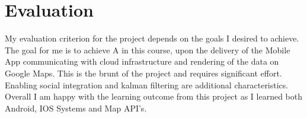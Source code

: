 \documentclass[10pt]{sigplan-proc-varsize}
\begin{document}
\section{Evaluation}
My evaluation criterion for the project depends on the goals I desired to achieve. The goal for me is to achieve A in this course, upon the delivery of the Mobile App communicating with cloud infrastructure and rendering of the data on Google Maps. This is the brunt of the project and requires significant effort. Enabling social integration and kalman filtering are additional characteristics. Overall I am happy with the learning outcome from this project as I learned both Android, IOS Systems and Map API's.

\appendix
%
%


\end{document}
